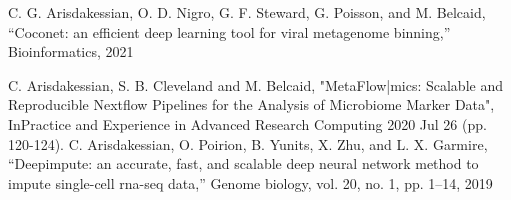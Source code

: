 %
%
%


\begin{scholarship}
    {C. G. Arisdakessian, O. D. Nigro, G. F. Steward, G. Poisson, and M. Belcaid, “Coconet: an efficient deep learning tool for viral metagenome binning,” Bioinformatics, 2021}

    {C. Arisdakessian, S. B. Cleveland and M. Belcaid, "MetaFlow|mics: Scalable and Reproducible Nextflow Pipelines for the Analysis of Microbiome Marker Data", InPractice and Experience in Advanced Research Computing 2020 Jul 26 (pp. 120-124).}
	{C. Arisdakessian, O. Poirion, B. Yunits, X. Zhu, and L. X. Garmire, “Deepimpute: an accurate, fast, and scalable deep neural network method to impute single-cell rna-seq data,” Genome biology, vol. 20, no. 1, pp. 1–14, 2019}

\end{scholarship}